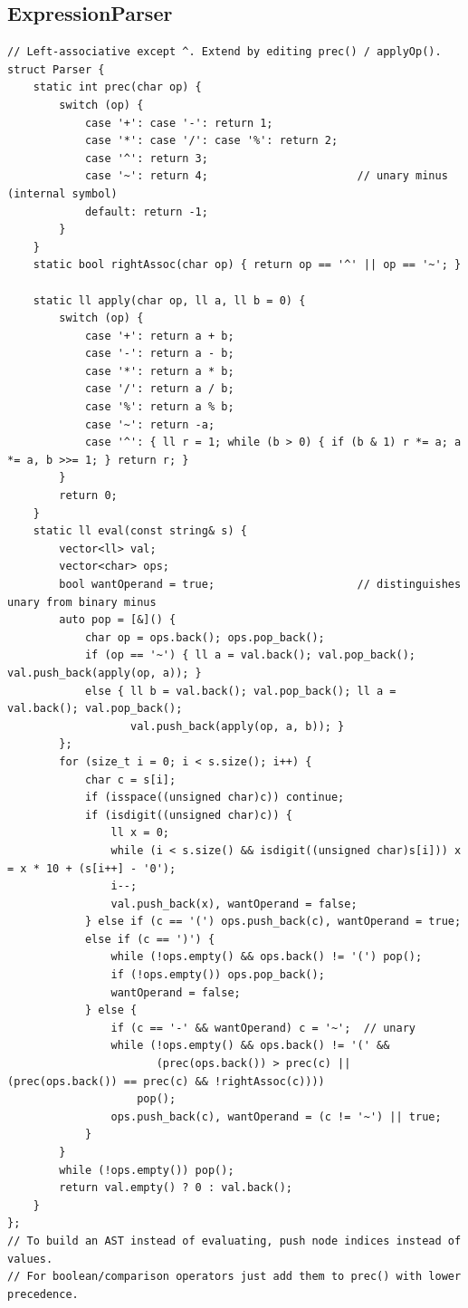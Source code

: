 \documentclass[9pt,a4paper,twocolumn]{extarticle}
\begin{document}
\subsection{ExpressionParser}
\nopagebreak
\begin{lstlisting}
// Left-associative except ^. Extend by editing prec() / applyOp().
struct Parser {
    static int prec(char op) {
        switch (op) {
            case '+': case '-': return 1;
            case '*': case '/': case '%': return 2;
            case '^': return 3;
            case '~': return 4;                       // unary minus (internal symbol)
            default: return -1;
        }
    }
    static bool rightAssoc(char op) { return op == '^' || op == '~'; }

    static ll apply(char op, ll a, ll b = 0) {
        switch (op) {
            case '+': return a + b;
            case '-': return a - b;
            case '*': return a * b;
            case '/': return a / b;
            case '%': return a % b;
            case '~': return -a;
            case '^': { ll r = 1; while (b > 0) { if (b & 1) r *= a; a *= a, b >>= 1; } return r; }
        }
        return 0;
    }
    static ll eval(const string& s) {
        vector<ll> val;
        vector<char> ops;
        bool wantOperand = true;                      // distinguishes unary from binary minus
        auto pop = [&]() {
            char op = ops.back(); ops.pop_back();
            if (op == '~') { ll a = val.back(); val.pop_back(); val.push_back(apply(op, a)); }
            else { ll b = val.back(); val.pop_back(); ll a = val.back(); val.pop_back();
                   val.push_back(apply(op, a, b)); }
        };
        for (size_t i = 0; i < s.size(); i++) {
            char c = s[i];
            if (isspace((unsigned char)c)) continue;
            if (isdigit((unsigned char)c)) {
                ll x = 0;
                while (i < s.size() && isdigit((unsigned char)s[i])) x = x * 10 + (s[i++] - '0');
                i--;
                val.push_back(x), wantOperand = false;
            } else if (c == '(') ops.push_back(c), wantOperand = true;
            else if (c == ')') {
                while (!ops.empty() && ops.back() != '(') pop();
                if (!ops.empty()) ops.pop_back();
                wantOperand = false;
            } else {
                if (c == '-' && wantOperand) c = '~';  // unary
                while (!ops.empty() && ops.back() != '(' &&
                       (prec(ops.back()) > prec(c) || (prec(ops.back()) == prec(c) && !rightAssoc(c))))
                    pop();
                ops.push_back(c), wantOperand = (c != '~') || true;
            }
        }
        while (!ops.empty()) pop();
        return val.empty() ? 0 : val.back();
    }
};
// To build an AST instead of evaluating, push node indices instead of values.
// For boolean/comparison operators just add them to prec() with lower precedence.
\end{lstlisting}
\end{document}
